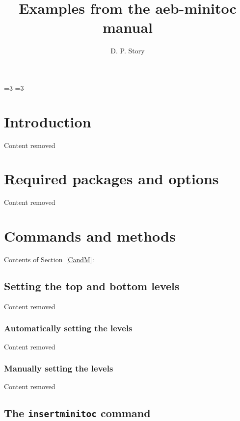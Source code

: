 \documentclass{article}
\title{Examples from the aeb-minitoc manual}
\author{D. P. Story}
\makeatletter
\renewcommand*{\thesubsubsection}{\texorpdfstring{$\bullet$}{\textbullet}}
\let\section@mtocSAVE\section
\renewcommand\section{\renewcommand{\@seccntformat}[1]{\thesection\space}%
  \section@mtocSAVE}
\let\subsection@mtocSAVE\subsection
\renewcommand\subsection{\renewcommand{\@seccntformat}[1]{\thesubsection\space}%
  \subsection@mtocSAVE}
\let\subsubsection@mtocSAVE\subsubsection
\renewcommand\subsubsection{\renewcommand{\@seccntformat}[1]{\thesubsubsection\space}%
  \subsubsection@mtocSAVE}
\def\cs#1{\texttt{\@backslashchar#1}}
\newcommand{\insMinitoci}[2][]{%
  \begin{center}#2
  \begin{minipage}[c]{0.8\linewidth}
  Contents of Section~\ref*{CandM}: \nameref*{CandM}
  \par\kern2pt
  \insertminitoc[#1]
  \end{minipage}
  \end{center}
}
\makeatother
\begin{document}
\maketitle

\bgroup
\value{secnumdepth}=3
\value{tocdepth}=3
\minitocFmtFullToc
\tableofcontents
\egroup

\newpage

\section{Introduction}

Content removed

\section{Required packages and options}

Content removed

\section{Commands and methods}

\insMinitoci{\minitocFmt}

\subsection[\protect\miniorfulltoc{\protect\textbf}{Setting the top and bottom levels}]{Setting the top and bottom levels}

Content removed

\subsubsection{Automatically setting the levels}

Content removed

\subsubsection{Manually setting the levels}

Content removed

\subsection{The \texorpdfstring{\protect\cs{insertminitoc}}{\textbackslash{insertminitoc}} command}
\end{document}
